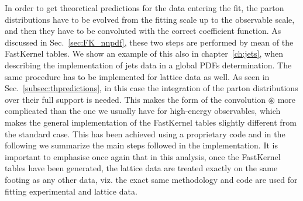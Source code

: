 In order to get theoretical predictions for the data entering the fit, 
the parton distributions have to be evolved from the fitting scale up to the observable scale, and then
they have to be convoluted with the correct coefficient function. 
As discussed in Sec.~\ref{sec:FK_nnpdf}, these two steps are performed by mean of the FastKernel tables.
We show an example of this also in chapter~\ref{ch:jets}, when describing the implementation of jets
data in a global PDFs determination.
%
The same procedure has to be implemented for lattice data as well.
As seen in Sec.~\ref{subsec:thpredictions}, in this case the
integration of the parton distributions over their full support is needed. This
makes the form of the convolution $\circledast$ more complicated than the one we
usually have for high-energy observables, which makes the general implementation of 
the FastKernel tables slightly different from the standard case.
This has been achieved using a proprietary code and in the following we summarize the main steps followed in 
the implementation.
It is important to emphasise once again that in this analysis, once the FastKernel tables have been generated, 
the lattice data are treated exactly on the same footing as any other data, viz. the exact same methodology 
and code are used for fitting experimental and lattice data.

